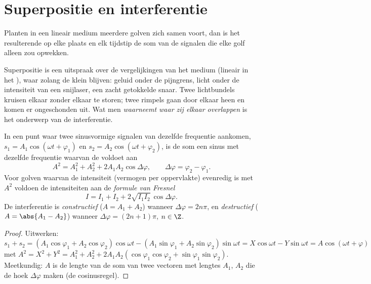 \section{Superpositie en interferentie}

\begin{theorem}[Superpositie]\label{thm:b1:wave-propagation:superposition}
Planten in een lineair medium meerdere golven zich samen voort, dan is het
resulterende  op elke plaats en elk tijdstip de som van de signalen die
elke golf alleen zou opwekken.
\end{theorem}
\admitted

\begin{remark}[Lineariteit]\label{rem:b1:wave-propagation:linearity}
Superpositie is een uitspraak over de vergelijkingen van het medium (lineair
in het ), waar zolang de  klein blijven: geluid onder de
pijngrens, licht onder de intensiteit van een snijlaser, een zacht getokkelde
snaar. Twee lichtbundels kruisen elkaar zonder elkaar te storen; twee rimpels
gaan door elkaar heen en komen er ongeschonden uit. Wat men \emph{waarneemt
waar zij elkaar overlappen} is het onderwerp van de interferentie.
\end{remark}

\begin{theorem}\label{thm:b1:wave-propagation:fresnel}
In een punt waar twee sinusvormige signalen van dezelfde frequentie aankomen,
$s_1 = A_1\cos(\omega t + \varphi_1)$ en $s_2 = A_2\cos(\omega t + \varphi_2)$,
is de som een sinus met dezelfde frequentie waarvan de  voldoet aan
\[
A^2 = A_1^2 + A_2^2 + 2A_1A_2\cos\Delta\varphi,
\qquad \Delta\varphi = \varphi_2 - \varphi_1 .
\]
Voor golven waarvan de intensiteit (vermogen per oppervlakte) evenredig is met
$A^2$ voldoen de intensiteiten aan de \emph{formule van Fresnel}
\[
I = I_1 + I_2 + 2\sqrt{I_1 I_2}\,\cos\Delta\varphi .
\]
De interferentie is \emph{constructief} ($A = A_1 + A_2$) wanneer
$\Delta\varphi = 2n\pi$, en \emph{destructief} ($A = \abs{A_1 - A_2}$)
wanneer $\Delta\varphi = (2n + 1)\pi$, $n \in \Z$.
\end{theorem}

\begin{proof}
Uitwerken: $s_1 + s_2 = (A_1\cos\varphi_1 + A_2\cos\varphi_2)\cos\omega t -
(A_1\sin\varphi_1 + A_2\sin\varphi_2)\sin\omega t = X\cos\omega t -
Y\sin\omega t = A\cos(\omega t + \varphi)$ met $A^2 = X^2 + Y^2 =
A_1^2 + A_2^2 + 2A_1A_2(\cos\varphi_1\cos\varphi_2 + \sin\varphi_1\sin\varphi_2)$.
Meetkundig: $A$ is de lengte van de som van twee vectoren met lengtes
$A_1$, $A_2$ die de hoek $\Delta\varphi$ maken (de cosinusregel).
\end{proof}

